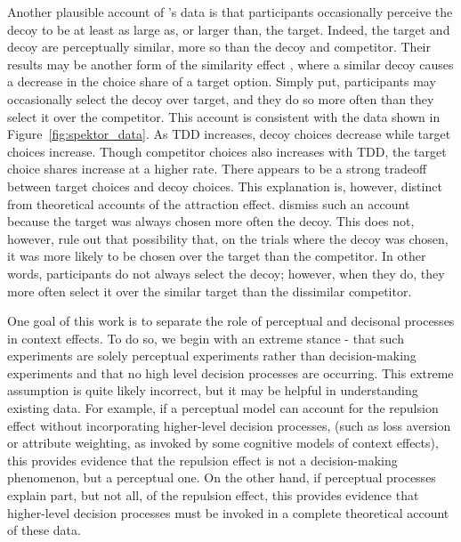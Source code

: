 Another plausible account of \textcite{spektorWhenGoodLooks2018b}'s data is that participants occasionally perceive the decoy to be at least as large as, or larger than, the target. Indeed, the target and decoy are perceptually similar, more so than the decoy and competitor. Their results may be another form of the similarity effect \parencite{tverskyEliminationAspectsTheory1972}, where a similar decoy causes a decrease in the choice share of a target option. Simply put, participants may occasionally select the decoy over target, and they do so more often than they select it over the competitor. This account is consistent with the data shown in Figure~\ref{fig:spektor_data}. As TDD increases, decoy choices decrease while target choices increase. Though competitor choices also increases with TDD, the target choice shares increase at a higher rate. There appears to be a strong tradeoff between target choices and decoy choices. This explanation is, however, distinct from theoretical accounts of the attraction effect. \textcite{spektorWhenGoodLooks2018b} dismiss such an account because the target was always chosen more often the decoy. This does not, however, rule out that possibility that, on the trials where the decoy was chosen, it was more likely to be chosen over the target than the competitor. In other words, participants do not always select the decoy; however, when they do, they more often select it over the similar target than the dissimilar competitor. 

One goal of this work is to separate the role of perceptual and decisonal processes in context effects. To do so, we begin with an extreme stance - that such experiments are solely perceptual experiments rather than decision-making experiments and that no high level decision processes are occurring. This extreme assumption is quite likely incorrect, but it may be helpful in understanding existing data. For example, if a perceptual model can account for the repulsion effect without incorporating higher-level decision processes, (such as loss aversion or attribute weighting, as invoked by some cognitive models of context effects), this provides evidence that the repulsion effect is not a decision-making phenomenon, but a perceptual one. On the other hand, if perceptual processes explain part, but not all, of the repulsion effect, this provides evidence that higher-level decision processes must be invoked in a complete theoretical account of these data.

